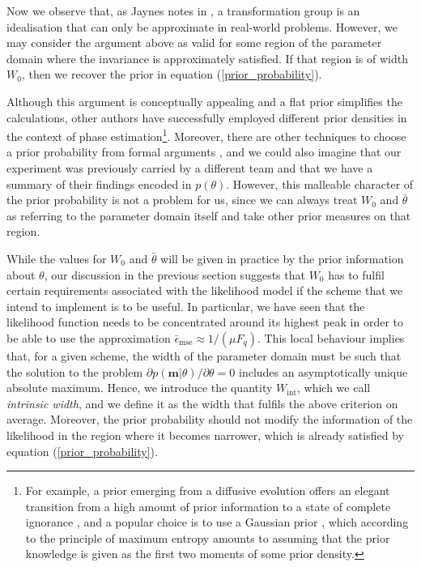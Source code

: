 Now we observe that, as Jaynes notes in \cite{jaynes2003}, a transformation group is an idealisation that can only be approximate in real-world problems. However, we may consider the argument above as valid for some region of the parameter domain where the invariance is approximately satisfied. If that region is of width $W_0$, then we recover the prior in equation (\ref{prior_probability}). 

Although this argument is conceptually appealing and a flat prior simplifies the calculations, other authors have successfully employed different prior densities in the context of phase estimation\footnote{For example, a prior emerging from a diffusive evolution offers an elegant transition from a high amount of prior information to a state of complete ignorance \cite{demkowicz2011}, and a popular choice is to use a Gaussian prior \cite{macieszczak2014bayesian, friis2017}, which according to the principle of maximum entropy \cite{jaynes2003} amounts to assuming that the prior knowledge is given as the first two moments of some prior density.}. Moreover, there are other techniques to choose a prior probability from formal arguments \cite{kass1996}, and we could also imagine that our experiment was previously carried by a different team and that we have a summary of their findings encoded in $p(\theta)$. However, this malleable character of the prior probability is not a problem for us, since we can always treat $W_0$ and $\bar{\theta}$ as referring to the parameter domain itself and take other prior measures on that region.

While the values for $W_0$ and $\bar{\theta}$ will be given in practice by the prior information about $\theta$, our discussion in the previous section suggests that $W_0$ has to fulfil certain requirements associated with the likelihood model if the scheme that we intend to implement is to be useful. In particular, we have seen that the likelihood function needs to be concentrated around its highest peak in order to be able to use the approximation $\bar{\epsilon}_{\mathrm{mse}} \approx 1/(\mu F_q)$. This local behaviour implies that, for a given scheme, the width of the parameter domain must be such that the solution to the problem $\partial p(\boldsymbol{m}|\theta)/\partial \theta = 0$ includes an asymptotically unique absolute maximum. Hence, we introduce the quantity $W_{\mathrm{int}}$, which we call \emph{intrinsic width}, and we define it as the width that fulfils the above criterion on average. Moreover, the prior probability should not modify the information of the likelihood in the region where it becomes narrower, which is already satisfied by equation (\ref{prior_probability}).

